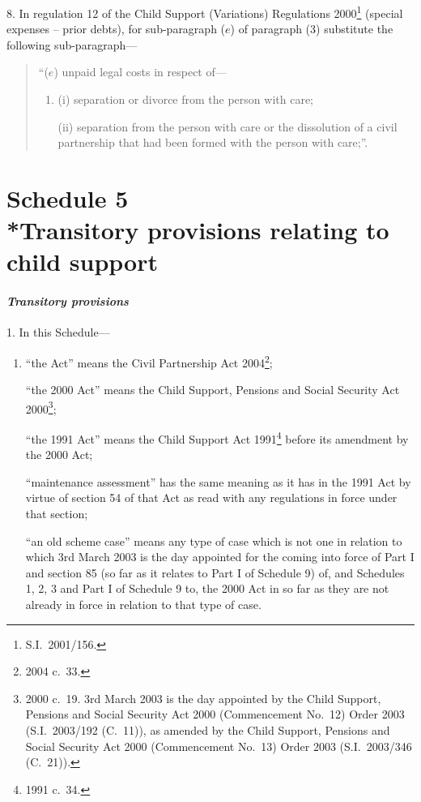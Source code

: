 \documentclass[12pt,a4paper]{article}
\begin{document}
8.  In regulation 12 of the Child Support (Variations) Regulations 2000\footnote{S.I.\ 2001/156.} (special expenses – prior debts), for sub-paragraph ($e$)  of paragraph (3) substitute the following sub-paragraph—
\begin{quotation}
“($e$) unpaid legal costs in respect of—
\begin{enumerate}\item[]
(i) separation or divorce from the person with care;

(ii) separation from the person with care or the dissolution of a civil partnership that had been formed with the person with care;”.
\end{enumerate}
\end{quotation}

\part[Schedule 5 --- Transitory provisions relating to child support]{Schedule 5\\*Transitory provisions relating to child support}

\renewcommand\parthead{--- Schedule 5}

\subsection*{\itshape Transitory provisions}

1.  In this Schedule—
\begin{enumerate}\item[]
“the Act” means the Civil Partnership Act 2004\footnote{2004 c.\ 33.};

“the 2000 Act” means the Child Support, Pensions and Social Security Act 2000\footnote{2000 c.\ 19. 3rd March 2003 is the day appointed by the Child Support, Pensions and Social Security Act 2000 (Commencement No.\ 12) Order 2003 (S.I.\ 2003/192 (C.\ 11)), as amended by the Child Support, Pensions and Social Security Act 2000 (Commencement No.\ 13) Order 2003 (S.I.\ 2003/346 (C.\ 21)).};

“the 1991 Act” means the Child Support Act 1991\footnote{1991 c.\ 34.} before its amendment by the 2000 Act;

“maintenance assessment” has the same meaning as it has in the 1991 Act by virtue of section 54 of that Act as read with any regulations in force under that section;

“an old scheme case” means any type of case which is not one in relation to which 3rd March 2003 is the day appointed for the coming into force of Part I and section 85 (so far as it relates to Part I of Schedule 9) of, and Schedules 1, 2, 3 and Part I of Schedule 9 to, the 2000 Act in so far as they are not already in force in relation to that type of case.
\end{enumerate}
\end{document}
